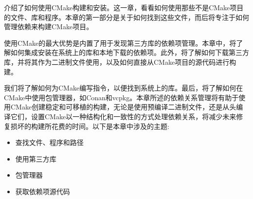 介绍了如何使用CMake构建和安装。这一章，看看如何使用那些不是CMake项目的文件、库和程序。本章的第一部分是关于如何找到这些文件，而后将专注于如何管理依赖来构建CMake项目。

使用CMake的最大优势是内置了用于发现第三方库的依赖项管理。本章中，将了解如何集成安装在系统上的库和本地下载的依赖项。此外，将了解如何下载第三方库，并将其作为二进制文件使用，以及如何直接从CMake项目的源代码进行构建。

我们将了解如何为CMake编写指令，以便找到系统上的库。最后，将了解如何在CMake中使用包管理器，如Conan和vcpkg。本章所述的依赖关系管理将有助于使用CMake创建稳定和可移植的构建，无论是使用预编译二进制文件，还是从头编译它们，设置CMake以一种结构化和一致性的方式处理依赖关系，将减少未来修复损坏的构建所花费的时间。以下是本章中涉及的主题:

\begin{itemize}
\item 
查找文件、程序和路径

\item 
使用第三方库

\item 
包管理器

\item 
获取依赖项源代码
\end{itemize}













